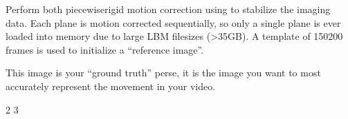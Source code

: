 \documentclass[letterpaper,10pt,english]{sphinxmanual}
\begin{document}
\sphinxAtStartPar
Perform both piecewise\sphinxhyphen{}rigid motion correction using {\hyperref[\detokenize{user_guide/pre_processing:normcorre}]{}} to stabilize the imaging data. Each plane is motion corrected sequentially, so
only a single plane is ever loaded into memory due to large LBM filesizes (\textgreater{}35GB). A template of 150\sphinxhyphen{}200 frames is used to initialize a “reference image”.

\noindent{}

\sphinxAtStartPar
This image is your “ground truth” per\sphinxhyphen{}se, it is the image you want to most accurately represent the movement in your video.

\begin{sphinxVerbatim}[commandchars=\\\{\}]


2
3


\end{sphinxVerbatim}
\end{document}

